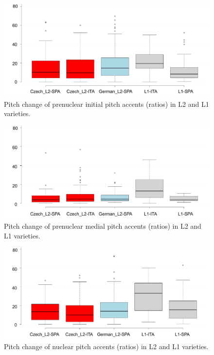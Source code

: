 \begin{figure}[p]
\includegraphics[width=\textwidth]{figures/Figure_131.pdf}
\caption{Pitch change of prenuclear initial pitch accents (ratios) in L2 and L1 varieties.}
\label{fig:4.131}
\end{figure}

\begin{figure}[p]
\includegraphics[width=\textwidth]{figures/Figure_132.pdf}
\caption{Pitch change of prenuclear medial pitch accents (ratios) in L2 and L1 varieties.}
\label{fig:4.132}
\end{figure}

\begin{figure}[p]
\includegraphics[width=\textwidth]{figures/Figure_133.pdf}
\caption{Pitch change of nuclear pitch accents (ratios) in L2 and L1 varieties.}
\label{fig:4.133}
\end{figure}

